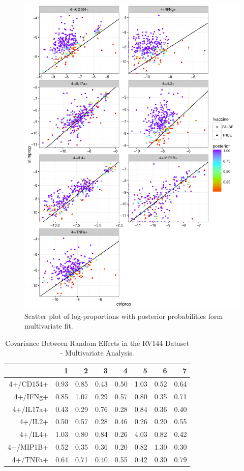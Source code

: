 \documentclass{article}\usepackage[]{graphicx}\usepackage[]{color}
\makeatletter
\def\maxwidth{ %
  \ifdim\Gin@nat@width>\linewidth
    \linewidth
  \else
    \Gin@nat@width
  \fi
}
\makeatother
\begin{document}
\begin{figure}
\includegraphics[width=\maxwidth]{figures/Rplot05} \caption[]{Scatter plot of log-proportions with posterior probabilities form multivariate fit.}
\label{IL4}
\end{figure}


\begin{table}[ht]
\centering
\begin{tabular}{rrrrrrrr}
  \hline
 & 1 & 2 & 3 & 4 & 5 & 6 & 7 \\ 
  \hline
4+/CD154+ & 0.93 & 0.85 & 0.43 & 0.50 & 1.03 & 0.52 & 0.64 \\ 
  4+/IFNg+ & 0.85 & 1.07 & 0.29 & 0.57 & 0.80 & 0.35 & 0.71 \\ 
  4+/IL17a+ & 0.43 & 0.29 & 0.76 & 0.28 & 0.84 & 0.36 & 0.40 \\ 
  4+/IL2+ & 0.50 & 0.57 & 0.28 & 0.46 & 0.26 & 0.20 & 0.55 \\ 
  4+/IL4+ & 1.03 & 0.80 & 0.84 & 0.26 & 4.03 & 0.82 & 0.42 \\ 
  4+/MIP1B+ & 0.52 & 0.35 & 0.36 & 0.20 & 0.82 & 1.30 & 0.30 \\ 
  4+/TNFa+ & 0.64 & 0.71 & 0.40 & 0.55 & 0.42 & 0.30 & 0.79 \\ 
   \hline
\end{tabular}
\caption{Covariance Between Random Effects in the RV144 Dataset - Multivariate Analysis.}
\label{multiCovTable}
\end{table}
\end{document}
